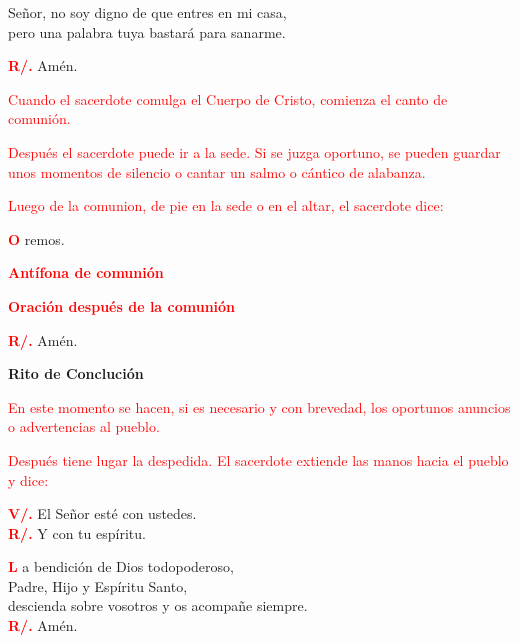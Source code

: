 \documentclass[12pt, letterpaper]{article}
\begin{document}
  \noindent
  \Large Se\~nor, no soy digno de que entres en mi casa,\\ 
  pero una palabra tuya bastar\'a para sanarme.

  \noindent
  \Large {\bfseries \textcolor{red}{R/.}} \hspace{0.5cm} Am\'en.

  \large{\textcolor{red}{Cuando el sacerdote comulga el Cuerpo de Cristo, comienza el canto de comuni\'on.}}

  \large{\textcolor{red}{Despu\'es el sacerdote puede ir a la sede. Si se juzga oportuno, se pueden guardar unos momentos de silencio o cantar un salmo o c\'antico de alabanza.}}

  \large{\textcolor{red}{Luego de la comunion, de pie en la sede o en el altar, el sacerdote dice:}}

  \lettrine[lines=1]{\bfseries \textcolor{red}{O}}{} \Large remos.

  \Large {\bfseries \textcolor{red}{Ant\'ifona de comuni\'on}}

  \Large {\bfseries \textcolor{red}{Oraci\'on despu\'es de la comuni\'on}}

  \noindent
  \Large {\bfseries \textcolor{red}{R/.}} \hspace{0.5cm} Am\'en.

  \clearpage
  
  \begin{center}
    \Huge {\bfseries Rito de Concluci\'on}
  \end{center}

  \large{\textcolor{red}{En este momento se hacen, si es necesario y con brevedad, los oportunos anuncios o advertencias al pueblo.}}

  \large{\textcolor{red}{Despu\'es tiene lugar la despedida. El sacerdote extiende las manos hacia el pueblo y dice:}}

  \noindent
  \Large {\bfseries \textcolor{red}{V/.}} \hspace{0.5cm} El Se\~nor est\'e con ustedes.\\
  \noindent
  \Large {\bfseries \textcolor{red}{R/.}} \hspace{0.5cm} Y con tu esp\'iritu.

  \lettrine[lines=2]{\bfseries \textcolor{red}{L}}{} \Large a bendici\'on de Dios todopoderoso, \\
  Padre, Hijo \Huge{\textcolor{red}{}} \Large y Esp\'iritu Santo, \\
  descienda sobre vosotros y os acompa\~ne siempre.\\
  \noindent
  \Large {\bfseries \textcolor{red}{R/.}} \hspace{0.5cm} Am\'en.
\end{document}
